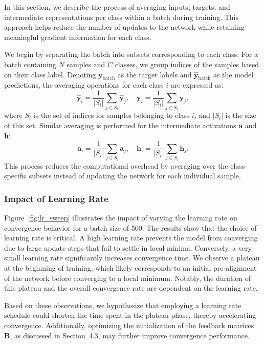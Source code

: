 \documentclass[english]{article}
\begin{document}
In this section, we describe the process of averaging inputs, targets, and intermediate representations per class within a batch during training. This approach helps reduce the number of updates to the network while retaining meaningful gradient information for each class.

We begin by separating the batch into subsets corresponding to each class. For a batch containing $N$ samples and $C$ classes, we group indices of the samples based on their class label. Denoting $\mathbf{y}_\text{batch}$ as the target labels and $\mathbf{\hat{y}}_\text{batch}$ as the model predictions, the averaging operations for each class $i$ are expressed as:
\[
\mathbf{\hat{y}}_i = \frac{1}{|S_i|} \sum_{j \in S_i} \mathbf{\hat{y}}_j, \quad
\mathbf{y}_i = \frac{1}{|S_i|} \sum_{j \in S_i} \mathbf{y}_j,
\]
where $S_i$ is the set of indices for samples belonging to class $i$, and $|S_i|$ is the size of this set. Similar averaging is performed for the intermediate activations $\mathbf{a}$ and $\mathbf{h}$:
\[
\mathbf{a}_i = \frac{1}{|S_i|} \sum_{j \in S_i} \mathbf{a}_j, \quad
\mathbf{h}_i = \frac{1}{|S_i|} \sum_{j \in S_i} \mathbf{h}_j.
\]
This process reduces the computational overhead by averaging over the class-specific subsets instead of updating the network for each individual sample.

\subsubsection{Impact of Learning Rate}

Figure~\ref{fig:lr_sweep} illustrates the impact of varying the learning rate on convergence behavior for a batch size of 500. The results show that the choice of learning rate is critical. A high learning rate prevents the model from converging due to large update steps that fail to settle in local minima. Conversely, a very small learning rate significantly increases convergence time. We observe a plateau at the beginning of training, which likely corresponds to an initial pre-alignment of the network before converging to a local minimum. Notably, the duration of this plateau and the overall convergence rate are dependent on the learning rate.

Based on these observations, we hypothesize that employing a learning rate schedule could shorten the time spent in the plateau phase, thereby accelerating convergence. Additionally, optimizing the initialization of the feedback matrices $\mathbf{B}$, as discussed in Section~4.3, may further improve convergence performance.
\end{document}
